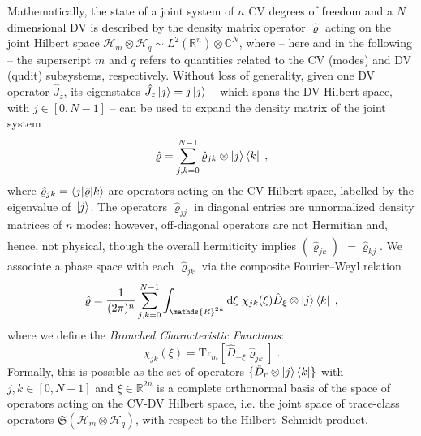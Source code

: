\documentclass[%
reprint,
superscriptaddress,
nofootinbib,
 amsmath,amssymb,
prx,
floatfix,
]{revtex4-2}
\begin{document}
Mathematically, the state of a joint system of $n$ CV degrees of freedom and a $N$ dimensional DV is described by the density matrix operator $\hat{\varrho}$ acting on the joint Hilbert space $\mathcal{H}_m \otimes\mathcal{H}_q \sim L^2(\mathds{R}^n) \otimes \mathds{C}^{N} $, where -- here and in the following -- the superscript $m$ and $q$ refers to quantities related to the CV (modes) and DV (qudit) subsystems, respectively. Without loss of generality, given one DV operator $\hat{J}_z$, its eigenstates $\hat{J}_z \ket{j} = j \ket{j}$ -- which spans the DV Hilbert space, with $j \in [ 0, N- 1]$ -- can be used to expand the density matrix of the joint system
\begin{equation}\label{rhojk}
    \hat{\varrho} = \sum_{j, k  = 0}^{N-1}  \hat{\varrho}_{jk} \otimes \ket{j} \bra{k} \;,
\end{equation}
where $ \hat{\varrho}_{jk} = \braket{j|\hat{\varrho}|k}  $ are operators acting on the CV Hilbert space, labelled by the eigenvalue of~$\ket{j}$. The operators $\hat{\varrho}_{jj}$ in diagonal entries are unnormalized density matrices of $n$ modes; however, off-diagonal operators are not Hermitian and, hence, not physical, though the overall hermiticity implies $(\hat{\varrho}_{jk})^\dag = \hat{\varrho}_{kj} $. We associate a phase space with each $ \hat{\varrho}_{jk} $ via the composite Fourier–Weyl relation 
\begin{equation}
\label{eq:density_phase_space}
    \hat{\varrho} = \frac{1}{(2 \pi)^n} \sum_{j, k  = 0}^{N-1} \int_{\mathds{R}^{2n}} \text{d} \xi \; \chi_{jk} (\xi)  \hat{D}_{\xi} \otimes \ket{j} \bra{k} \;,
\end{equation}
where we define the \textit{Branched Characteristic Functions}: \begin{equation}
\label{eq:chara_jk_def}
    \chi_{jk} (\xi) = \text{Tr}_m [ \hat{D}_{- \xi}  \hat{\varrho}_{jk} ] \;.
\end{equation}
Formally, this is possible as the set of operators $\{\hat{D}_{r} \otimes \ket{j} \bra{k} \} $ with $j,k  \in [ 0, N-1] $ and $\xi \in \mathds{R}^{2n}$ is a complete orthonormal basis of the space of operators acting on the CV-DV Hilbert space, i.e. the joint space of trace-class operators $\mathfrak{S} (\mathcal{H}_m \otimes\mathcal{H}_q)$, with respect to the Hilbert--Schmidt product.
\end{document}
